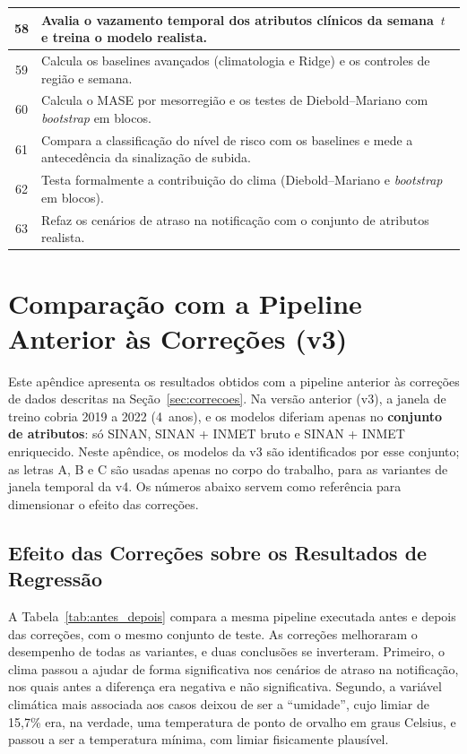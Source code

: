 \begin{apendicesenv}
\begin{table}[htbp]
\begin{tabular}{|c|p{}|}
58 & Avalia o vazamento temporal dos atributos clínicos da semana~$t$ e treina o modelo realista. \\ \hline
59 & Calcula os baselines avançados (climatologia e Ridge) e os controles de região e semana. \\ \hline
60 & Calcula o MASE por mesorregião e os testes de Diebold--Mariano com \textit{bootstrap} em blocos. \\ \hline
61 & Compara a classificação do nível de risco com os baselines e mede a antecedência da sinalização de subida. \\ \hline
62 & Testa formalmente a contribuição do clima (Diebold--Mariano e \textit{bootstrap} em blocos). \\ \hline
63 & Refaz os cenários de atraso na notificação com o conjunto de atributos realista. \\ \hline
\end{tabular}
\end{table}

\chapter{Comparação com a Pipeline Anterior às Correções (v3)}
\label{ap:comparacao_v3}

Este apêndice apresenta os resultados obtidos com a pipeline anterior às correções de dados descritas na Seção~\ref{sec:correcoes}. Na versão anterior (v3), a janela de treino cobria 2019 a 2022 (4~anos), e os modelos diferiam apenas no \textbf{conjunto de atributos}: só SINAN, SINAN + INMET bruto e SINAN + INMET enriquecido. Neste apêndice, os modelos da v3 são identificados por esse conjunto; as letras A, B e C são usadas apenas no corpo do trabalho, para as variantes de janela temporal da v4. Os números abaixo servem como referência para dimensionar o efeito das correções.

\section{Efeito das Correções sobre os Resultados de Regressão}

A Tabela~\ref{tab:antes_depois} compara a mesma pipeline executada antes e depois das correções, com o mesmo conjunto de teste. As correções melhoraram o desempenho de todas as variantes, e duas conclusões se inverteram. Primeiro, o clima passou a ajudar de forma significativa nos cenários de atraso na notificação, nos quais antes a diferença era negativa e não significativa. Segundo, a variável climática mais associada aos casos deixou de ser a ``umidade'', cujo limiar de 15,7\% era, na verdade, uma temperatura de ponto de orvalho em graus Celsius, e passou a ser a temperatura mínima, com limiar fisicamente plausível.


\end{apendicesenv}
